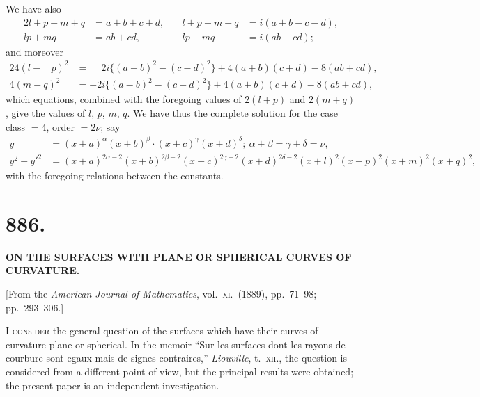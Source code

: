 \documentclass[11pt,a4paper]{article}
\theoremstyle{plain}
\theoremstyle{definition}
\begin{document}
We have also
\begin{alignat*}{2}
l+p+m+q &= a+b+c+d, &\quad l+p-m-q &= i(a+b-c-d), \\
lp+mq &= ab+cd, &\quad lp-mq &= i(ab-cd);
\end{alignat*}
and moreover
\begin{alignat*}{2}
4(l-\phantom{m}p)^2 &= \phantom{-}2i\{(a-b)^2-(c-d)^2\} + 4(a+b)(c+d) - 8(ab+cd), \\
4(m-q)^2 &= -2i\{(a-b)^2-(c-d)^2\} + 4(a+b)(c+d) - 8(ab+cd),
\end{alignat*}
which equations, combined with the foregoing values of $2(l+p)$ and $2(m+q)$, give the values of $l$, $p$, $m$, $q$. We have thus the complete solution for the case class $=4$, order $=2\nu$; say
\begin{align*}
y &= (x+a)^{\alpha} (x+b)^{\beta} \cdot (x+c)^{\gamma} (x+d)^{\delta};\ \alpha+\beta = \gamma+\delta = \nu, \\
y^2 + y'^2 &= (x+a)^{2\alpha-2} (x+b)^{2\beta-2} (x+c)^{2\gamma-2} (x+d)^{2\delta-2} (x+l)^2 (x+p)^2 (x+m)^2 (x+q)^2,
\end{align*}
with the foregoing relations between the constants.


\newpage
\section*{886.}

\begin{center}
\textbf{ON THE SURFACES WITH PLANE OR SPHERICAL CURVES OF CURVATURE.}
\end{center}

\begin{center}
[From the \textit{American Journal of Mathematics}, vol.\ \textsc{xi}.\ (1889), pp.\ 71--98; pp.\ 293--306.]
\end{center}

\textsc{I consider} the general question of the surfaces which have their curves of curvature plane or spherical. In the memoir ``Sur les surfaces dont les rayons de courbure sont egaux mais de signes contraires,'' \textit{Liouville}, t.~\textsc{xii}., the question is considered from a different point of view, but the principal results were obtained; the present paper is an independent investigation.
\end{document}
